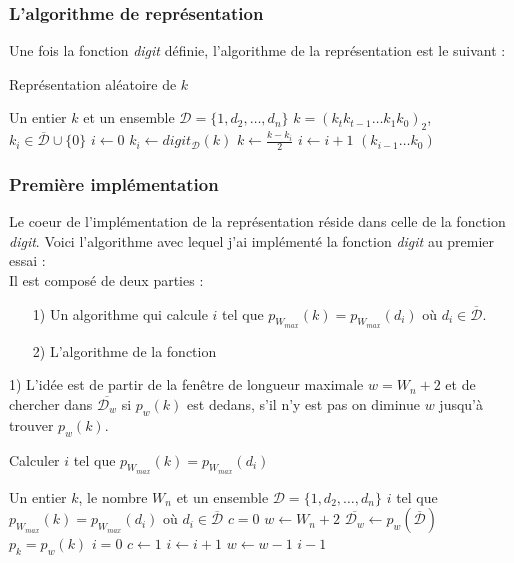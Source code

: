 \documentclass[12pt, a4paper]{memoir}
\begin{document}
\subsubsection{L'algorithme de représentation}

Une fois la fonction \emph{digit} définie, l'algorithme de la représentation est le suivant :

\begin{algorithm}
 \caption{Représentation aléatoire de $k$}
 \begin{algorithmic}
  \REQUIRE Un entier $k$ et un ensemble $\mathcal{D} = \{1,d_2,\ldots,d_n\}$
  \ENSURE $k = (k_t k_{t-1} \ldots k_1 k_0)_2$, $k_i \in  \overline{\mathcal{D}} \cup \{0\}$
  \STATE $i \leftarrow 0$
  \STATE $k_i \leftarrow digit_{\mathcal{D}}(k)$
  \STATE $k \leftarrow \frac{k-k_i}{2}$
  \STATE $i \leftarrow i+1$
  \ENDWHILE
  \RETURN $(k_{i-1} \ldots k_0)$
 \end{algorithmic}
\end{algorithm}

\subsubsection{Première implémentation}

Le coeur de l'implémentation de la représentation réside dans celle de la fonction \emph{digit}.
Voici l'algorithme avec lequel j'ai implémenté la fonction \emph{digit} au premier essai : \\
Il est composé de deux parties :
\begin{itemize}
 \item [1)] Un algorithme qui calcule $i$ tel que $p_{W_{max}}(k) = p_{W_{max}}(d_i)$ où $d_i \in \overline{\mathcal{D}}$.
 \item [2)] L'algorithme de la fonction
\end{itemize}

1) L'idée est de partir de la fenêtre de longueur maximale $w=W_n+2$ et de chercher dans $\overline{\mathcal{D}_w}$
si $p_w(k)$ est dedans, s'il n'y est pas on diminue $w$ jusqu'à trouver $p_w(k)$.

\begin{algorithm}
 \caption{Calculer $i$ tel que $p_{W_{max}}(k) = p_{W_{max}}(d_i)$}
 \begin{algorithmic}
  \REQUIRE Un entier $k$, le nombre $W_n$ et un ensemble $\mathcal{D} = \{1,d_2,\ldots,d_n\}$
  \ENSURE $i$ tel que $p_{W_{max}}(k) = p_{W_{max}}(d_i)$ où $d_i \in \overline{\mathcal{D}}$
  \STATE $c = 0$  
  \STATE $w \leftarrow W_n+2$
  \STATE $\overline{\mathcal{D}_w} \leftarrow p_w(\overline{\mathcal{D}})$
  \STATE $p_k = p_w(k)$
  \STATE $i = 0$
  \STATE $c \leftarrow 1$
  \ENDIF
  \STATE $i \leftarrow i+1$
  \ENDWHILE
  \STATE $w \leftarrow w-1$
  \ENDWHILE
  \RETURN $i-1$
 \end{algorithmic}
\end{algorithm}
\end{document}
